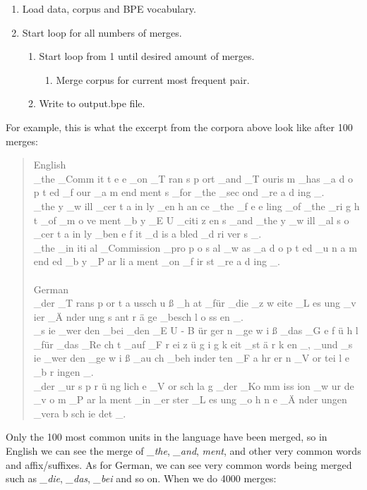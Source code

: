 \begin{enumerate}
	\item Load data, corpus and BPE vocabulary.
	\item Start loop for all numbers of merges.
	\begin{enumerate}
		\item Start loop from 1 until desired amount of merges.
		\begin{enumerate}
			\item Merge corpus for current most frequent pair.
		\end{enumerate}
		\item Write to output.bpe file.
	\end{enumerate}
\end{enumerate}

For example, this is what the excerpt from the corpora above look like after 100 merges:

\begin{quote}
	English\\
	\_the \_Comm it t e e \_on \_T ran s p ort \_and \_T ouris m \_has \_a d o p t ed \_f our \_a m end ment s \_for \_the \_sec ond \_re a d ing \_.\\
	\_the y \_w ill \_cer t a in ly \_en h an ce \_the \_f e e ling \_of \_the \_ri g h t \_of \_m o ve ment \_b y \_E U \_citi z en s \_and \_the y \_w ill \_al s o \_cer t a in ly \_ben e f it \_d is a bled \_d ri ver s \_.\\
	\_the \_in iti al \_Commission \_pro p o s al \_w as \_a d o p t ed \_u n a m end ed \_b y \_P ar li a ment \_on \_f ir st \_re a d ing \_.\\\\
	German\\
	\_der \_T rans p or t a ussch u ß \_h at \_für \_die \_z w eite \_L es ung \_v ier \_Ä nder ung s ant r ä ge \_besch l o ss en \_.\\
	\_s ie \_wer den \_bei \_den \_E U - B ür ger n \_ge w i ß \_das \_G e f ü h l \_für \_das \_Re ch t \_auf \_F r ei z ü g i g k eit \_st ä r k en \_, \_und \_s ie \_wer den \_ge w i ß \_au ch \_beh inder ten \_F a hr er n \_V or tei l e \_b r ingen \_.\\
	\_der \_ur s p r ü ng lich e \_V or sch la g \_der \_Ko mm iss ion \_w ur de \_v o m \_P ar la ment \_in \_er ster \_L es ung \_o h n e \_Ä nder ungen \_vera b sch ie det \_.
\end{quote}

Only the 100 most common units in the language have been merged, so in English we can see the merge of \emph{\_the}, \emph{\_and}, \emph{ment}, and other very common words and affix/suffixes. As for German, we can see very common words being merged such as \emph{\_die}, \emph{\_das}, \emph{\_bei} and so on. When we do 4000 merges:

